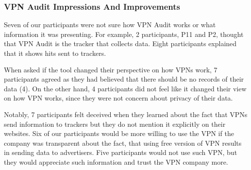 \subsubsection{VPN Audit Impressions And Improvements} 

Seven of our participants were not sure how VPN Audit works or what
information it was presenting. For example, 2 participants, P11 and P2,
thought that VPN Audit is the tracker that collects data. Eight participants
explained that it shows hits sent to trackers. 

When asked if the tool changed their perspective on how VPNs work, 7
participants agreed as they had believed that there should be no records of
their data (4). On the other hand, 4 participants did not feel like it changed
their view on how VPN works, since they were not concern about privacy of
their data.

Notably, 7 participants felt deceived when they learned about the fact that
VPNs send information to trackers but they do not mention it explicitly on
their websites. Six of our participants would be more willing to use the VPN
if the company was transparent about the fact, that using free version of VPN
results in sending data to advertisers. Five participants would not use such
VPN, but they would appreciate such information and trust the VPN company
more. 


